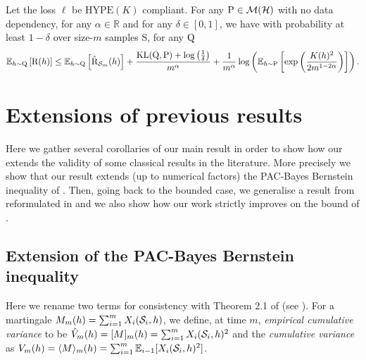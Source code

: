 \begin{noaddcontents}
\begin{theorem}
\label{th: haddouche_thm}
Let the loss $\ell$ be $\mathrm{HYPE}(K)$ compliant. For any $\P\in\mathcal{M}(\mathcal{H})$ with no data dependency, for any $\alpha\in\mathbb{R}$ and for any $\delta\in[0,1]$, we have with probability at least $1-\delta$ over size-$m$ samples S,
for any $\Q$%
\begin{align*}
\mathbb{E}_{h\sim \Q}\left[ \Risk(h)\right]
\leq \mathbb{E}_{h\sim \Q}\left[ \Riskhat_{\Sm}(h)\right] + \frac{\operatorname{KL}(\Q,\P) + \log\left(\frac{1}{\delta}\right)}{m^{\alpha}}
+\frac{1}{m^{\alpha}}\log\left(\mathbb{E}_{h\sim \P} \left[\exp\left( \frac{K(h)^2}{2m^{1-2\alpha}} \right) \right]\right).
\end{align*}
\end{theorem}


\section{Extensions of previous results}
\label{sec: extensions}

Here we gather several corollaries of our main result in order to show how our  extends the validity of some classical results in the literature. More precisely we show that our result extends (up to numerical factors) the PAC-Bayes Bernstein inequality of \citet{seldin2012bandit}.
Then, going back to the bounded case, we generalise a result from \citet{catoni2007pac} reformulated in \citet{alquier2016properties} and we also show how our work strictly improves on the bound of \citet{haddouche2021pac}.

\subsection{Extension of the PAC-Bayes Bernstein inequality}
\label{subsec: comparison_seldin}

Here we rename two terms for consistency with Theorem 2.1 of \citet{seldin2012bandit} (see ). For a martingale $M_m(h)= \sum_{i=1}^m X_i(\S_i,h)$, we define, at time $m$, \emph{empirical cumulative variance } to be $\hat{V}_m(h)= [M]_m(h) = \sum_{i=1}^m X_i(\S_i,h)^2$ and
the \emph{cumulative variance} as $V_m(h)= \langle M\rangle_m(h) = \sum_{i=1}^m \mathbb{E}_{i-1}[X_i(\S_i,h)^2]$.


\end{noaddcontents}
